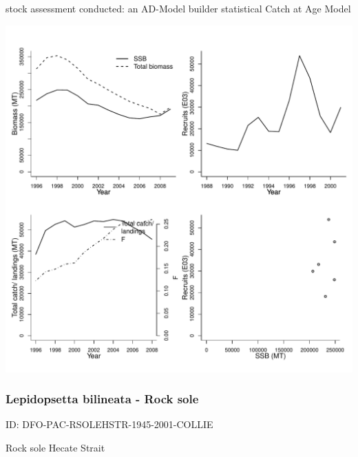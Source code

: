 stock assessment conducted: an AD-Model builder statistical Catch at Age Model 
\begin{center}
\vspace{-0.2cm}\includegraphics[scale=0.65]{../tex/figures/plot-IPHC-PHALNPAC-1988-2009-Parma.pdf}
\end{center}

\newpage
\subsubsection{Lepidopsetta bilineata - Rock sole}
ID: DFO-PAC-RSOLEHSTR-1945-2001-COLLIE

Rock sole Hecate Strait 

